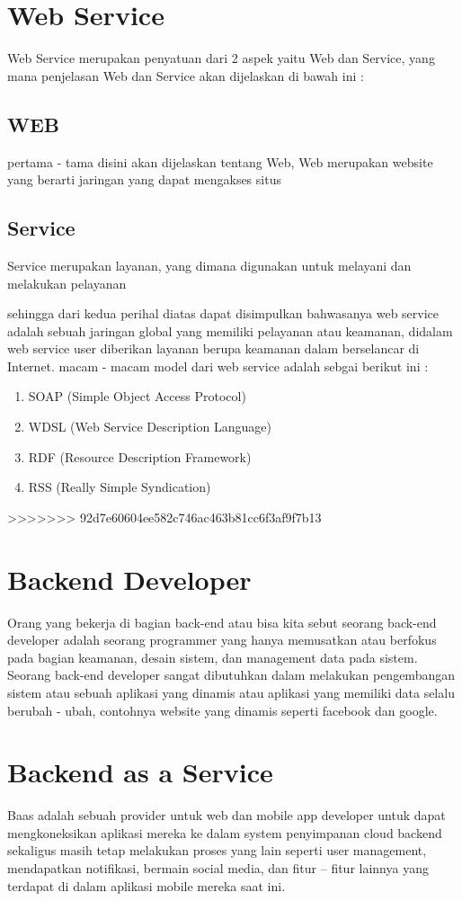 \section{Web Service}
Web Service merupakan penyatuan dari 2 aspek yaitu Web dan Service, yang mana penjelasan Web dan Service akan dijelaskan di bawah ini :

\subsection{WEB}
pertama - tama disini akan dijelaskan tentang Web, Web merupakan website yang berarti jaringan yang dapat mengakses situs

\subsection{Service}
Service merupakan layanan, yang dimana digunakan untuk melayani dan melakukan pelayanan

sehingga dari kedua perihal diatas dapat disimpulkan bahwasanya web service adalah sebuah jaringan global yang memiliki pelayanan atau keamanan,
didalam web service user diberikan layanan berupa keamanan dalam berselancar di Internet. macam - macam model dari web service adalah sebgai berikut ini :

\begin{enumerate}
\item SOAP (Simple Object Access Protocol)
\item WDSL (Web Service Description Language)
\item RDF (Resource Description Framework)
\item RSS (Really Simple Syndication)
\end {enumerate}
>>>>>>> 92d7e60604ee582c746ac463b81cc6f3af9f7b13

\section{Backend Developer}
Orang yang bekerja di bagian back-end atau bisa kita sebut seorang back-end developer adalah seorang programmer yang hanya
memusatkan atau berfokus pada bagian keamanan, desain sistem, dan management data pada sistem. Seorang back-end developer
sangat dibutuhkan dalam melakukan pengembangan sistem atau sebuah aplikasi yang dinamis atau aplikasi yang memiliki data selalu
berubah - ubah, contohnya website yang dinamis seperti facebook dan google.

\section{Backend as a Service}
Baas adalah sebuah provider untuk web dan mobile app developer untuk dapat mengkoneksikan 
aplikasi mereka ke dalam system penyimpanan cloud backend sekaligus masih tetap melakukan proses yang lain seperti user management, 
mendapatkan notifikasi, bermain social media, dan fitur – fitur lainnya yang terdapat di dalam aplikasi mobile mereka saat ini.

